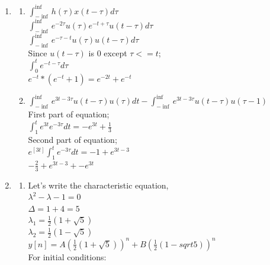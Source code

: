 \documentclass[10pt,a4paper, margin=1in]{article}
\begin{document}
\begin{enumerate}
\item %
    \begin{enumerate}
    \item $\int_{-\inf}^{\inf} h(\tau)x(t-\tau)d\tau$\\
    $\int_{-\inf}^{\inf} e^{-2\tau}u(\tau)e^{-t+\tau}u(t-\tau)d\tau$\\
    $\int_{-\inf}^{\inf} e^{-\tau-t}u(\tau)u(t-\tau)d\tau$\\
    Since $u(t-\tau)$ is 0 except $\tau <= t$;\\
    $\int_0^t e^{-t-\tau} d\tau$\\
    $e^{-t}*(e^{-t}+1) = e^{-2t} + e^{-t}$\\
    \item %
    $\int_{-\inf}^{\inf} e^{3t-3\tau}u(t-\tau)u(\tau)dt - \int_{-\inf}^{\inf}e^{3t-3\tau}u(t-\tau)u(\tau-1)$\\
    First part of equation;\\
    $\int^t_1 e^{3t}e^{-3\tau}dt = -e^{3t} + \frac{1}{3}$\\
    Second part of equation;\\
    $e^[3t]\int^t_1 e^{-3\tau} dt = -1 + e^{3t-3}$\\
    $-\frac{2}{3} + e^{3t-3} + -e^{3t}$\\
    \end{enumerate}

\item %
    \begin{enumerate}   
    \item %
    Let's write the characteristic equation, \\

    $\lambda^2 -\lambda-1 = 0$ \\

    $\Delta = 1 + 4 = 5$ \\

    $\lambda_1 = \frac{1}{2}(1+\sqrt{5})$ \\

    $\lambda_2 = \frac{1}{2}(1-\sqrt{5})$ \\

    $y[n] = A(\frac{1}{2}(1+\sqrt{5}))^n + B (\frac{1}{2}(1-sqrt{5}))^n$\\

    For initial conditions: \\


\end{enumerate}
\end{enumerate}
\end{document}
